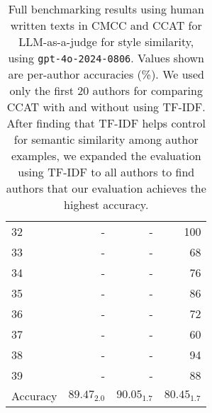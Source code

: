 \begin{table*}[t]
\begin{tabular}{lrrr}
        32 & - & - & 100 \\
        33 & - & - & 68 \\
        34 & - & - & 76 \\
        35 & - & - & 86 \\
        36 & - & - & 72 \\
        37 & - & - & 60 \\
        38 & - & - & 94 \\
        39 & - & - & 88 \\
        \hline
        Accuracy & $89.47_{2.0}$ & $90.05_{1.7}$ & $80.45_{1.7}$ \\
        \hline
    \end{tabular}
    \caption{Full benchmarking results using human written texts in CMCC and CCAT for LLM-as-a-judge for style similarity, using \texttt{gpt-4o-2024-0806}. Values shown are per-author accuracies (\%). We used only the first 20 authors for comparing CCAT with and without using TF-IDF. 
    After finding that TF-IDF helps control for semantic similarity among author examples, we expanded the evaluation using TF-IDF to all authors to find authors that our evaluation achieves the highest accuracy.}
    \label{tab:per_author_evaluation_benchmark}
\end{table*}

